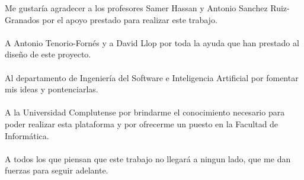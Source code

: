 Me gustaría agradecer a los profesores Samer Hassan y Antonio Sanchez
Ruiz-Granados por el apoyo prestado para realizar este trabajo.
\\
\mbox{}
\\
A Antonio Tenorio-Fornés y a David Llop por toda la ayuda que han prestado al
diseño de este proyecto.
\\
\mbox{}
\\
Al departamento de Ingeniería del Software e Inteligencia Artificial por
fomentar mis ideas y pontenciarlas.
\\
\mbox{}
\\
A la Universidad Complutense por brindarme el conocimiento necesario para poder
realizar esta plataforma y por ofrecerme un puesto en la Facultad de Informática.
\\
\mbox{}
\\
A todos los que piensan que este trabajo no llegará a ningun lado, que me dan
fuerzas para seguir adelante. \endinput
